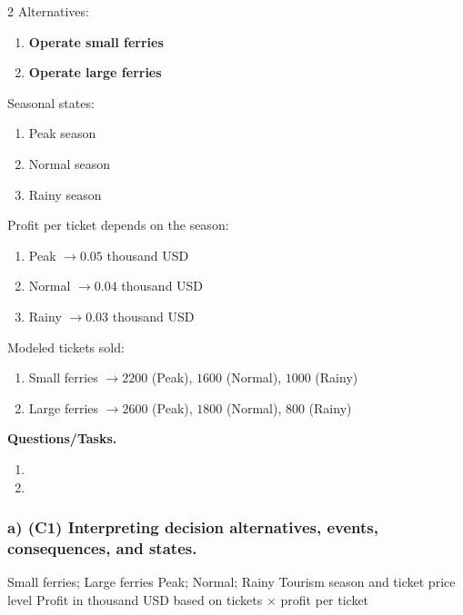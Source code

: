 	\begin{multicols}{2}
		Alternatives:
		\begin{enumerate}[label=\arabic*.]
			\item \textbf{Operate small ferries}
			\item \textbf{Operate large ferries}
		\end{enumerate}
	
		Seasonal states:
		\begin{enumerate}[label=\arabic*.]
			\item Peak season
			\item Normal season
			\item Rainy season
		\end{enumerate}
	
			\columnbreak
	
		Profit per ticket depends on the season:
		\begin{enumerate}[label=\arabic*.]
			\item Peak $\to 0.05$ thousand USD
			\item Normal $\to 0.04$ thousand USD
			\item Rainy $\to 0.03$ thousand USD
		\end{enumerate}
	
		Modeled tickets sold:
		\begin{enumerate}[label=\arabic*.]
			\item Small ferries $\to 2200$ (Peak), $1600$ (Normal), $1000$ (Rainy)
			\item Large ferries $\to 2600$ (Peak), $1800$ (Normal), $800$ (Rainy)
		\end{enumerate}
	\end{multicols}

	\textbf{Questions/Tasks.}
	\begin{enumerate}[label=\textbf{\alph*)}]
		\item {}
		\item {}
	\end{enumerate}
	
	\subsubsection*{a) \textbf{(C1)} Interpreting decision alternatives, events, consequences, and states.}
	\label{subsec:problem7-lake-ferry-tourism-c1}
	\DecisionElementsTable
	{Small ferries; Large ferries}
	{Peak; Normal; Rainy}
	{Tourism season and ticket price level}
	{Profit in thousand USD based on tickets $\times$ profit per ticket}
	
